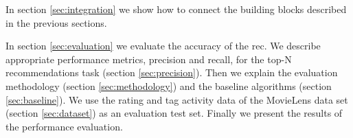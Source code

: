 In section \ref{sec:integration} we show how to connect the building blocks described in the previous sections.

In section \ref{sec:evaluation} we evaluate the accuracy of the \gls{rec}. We describe appropriate performance metrics, \gls{precision} and \gls{recall}, for the top-N recommendations task (section \ref{sec:precision}). 
Then we explain the evaluation methodology (section \ref{sec:methodology}) and the baseline algorithms (section \ref{sec:baseline}). 
We use the rating and tag activity data of the MovieLens data set (section \ref{sec:dataset}) as an evaluation test set. 
Finally we present the results of the performance evaluation. 












